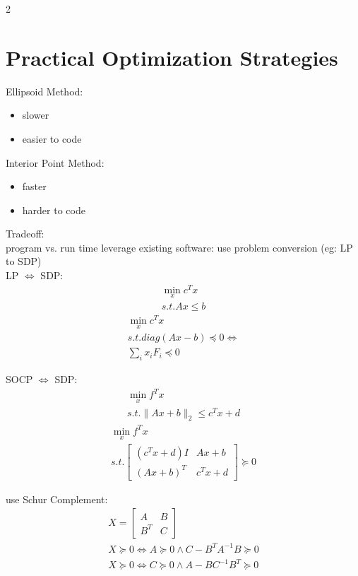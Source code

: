\documentclass[8pt]{extarticle}
\newcommand{\norm}[1]{\|#1\|}
\begin{document}
\begin{multicols*}{2}
  \vfill\null
 
  \pagebreak

  \section{Practical Optimization Strategies}
  
  Ellipsoid Method:
  \begin{itemize}
  \item slower
  \item easier to code
  \end{itemize}

  Interior Point Method:
  \begin{itemize}
  \item faster
  \item harder to code
  \end{itemize}

  Tradeoff:\\
  program vs. run time
  leverage existing software: use problem conversion (eg: LP to SDP)\\
  LP $\iff$ SDP:
  \begin{align*}
    \min_{x} c^Tx\\
    s.t. Ax \leq b
  \end{align*}
  \begin{align*}
    \min_{x} c^Tx\\
    s.t. diag(Ax-b) \preceq 0 \iff\\
    \sum_i x_i F_i \preceq 0
  \end{align*}

  SOCP $\iff$ SDP:
  \begin{align*}
    \min_x f^Tx\\
    s.t. \norm{Ax+b}_2 \leq c^Tx + d
  \end{align*}
  \begin{align*}
    \min_x f^Tx\\
    s.t.
    \begin{bmatrix}
      (c^Tx+d)I & Ax+b\\
      (Ax+b)^T & c^Tx+d
    \end{bmatrix} \succeq 0
  \end{align*}

  use Schur Complement:\\
  \begin{align*}
    X = \begin{bmatrix}
      A & B \\
      B^T & C
    \end{bmatrix}\\
    X \succeq 0 \iff A \succeq 0 \wedge C-B^TA^{-1}B \succeq 0\\
    X \succeq 0 \iff C \succeq 0 \wedge A-BC^{-1}B^T \succeq 0
  \end{align*}


\end{multicols*}
\end{document}
